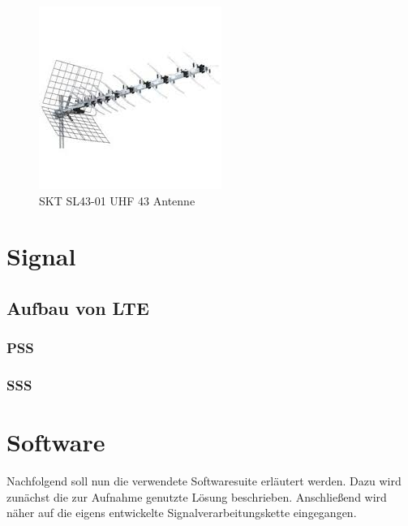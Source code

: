\begin{figure}
    \centering
    \includegraphics[width=\textwidth]{images/antenne.png}
    \caption{SKT SL43-01 UHF 43 Antenne}\label{antenne}
\end{figure}
\section{Signal}
\subsection{Aufbau von LTE}
\subsubsection{PSS}
\subsubsection{SSS}
\section{Software}

Nachfolgend soll nun die verwendete Softwaresuite erläutert werden. Dazu wird zunächst die zur Aufnahme genutzte Lösung beschrieben. Anschließend wird näher auf die eigens entwickelte Signalverarbeitungskette eingegangen.


